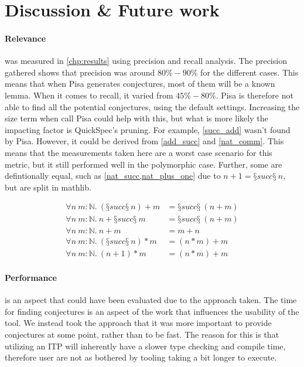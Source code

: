 \section{Discussion \& Future work}\label{sec:discussion}

\paragraph*{Relevance} was measured in \cref{chp:results} using precision and recall analysis.
The precision gathered shows that precision was around $80\%-90\%$ for the different cases.
This means that when Pisa generates conjectures, most of them will be a known lemma.
When it comes to recall, it varied from $45\%-80\%$.
Pisa is therefore not able to find all the potential conjectures, using the default settings.
Increasing the size term when call Pisa could help with this, but what is more likely the impacting factor is QuickSpec's pruning.
For example, \cref{succ_add} wasn't found by Pisa.
However, it could be derived from \cref{add_succ} and \cref{nat_comm}.
This means that the measurements taken here are a worst case scenario for this metric, but it still performed well in the polymorphic case.
Further, some are defintionally equal, such as \cref{nat_succ,nat_plus_one} due to $n+1 = §succ§\ n$, but are split in mathlib.

\vspace{-0.7cm}
\begin{align}
\forall n\ m : \mathbb{N}.\ (§succ§\ n) + m &= §succ§\ (n + m) \label{succ_add} \\
\forall n\ m : \mathbb{N}.\ n + §succ§\ m &= §succ§\ (n + m) \label{add_succ} \\
\forall n\ m : \mathbb{N}.\ n + m &= m + n \label{nat_comm} \\
\forall n\ m : \mathbb{N}.\ (§succ§\ n) * m &= (n * m) + m \label{nat_succ} \\
\forall n\ m : \mathbb{N}.\ (n + 1) * m &= (n * m) + m \label{nat_plus_one}
\end{align}

\paragraph*{Performance} is an aspect that could have been evaluated due to the approach taken.
The time for finding conjectures is an aspect of the work that influences the usability of the tool.
We instead took the approach that it was more important to provide conjectures at some point, rather than to be fast.
The reason for this is that utilizing an ITP will inherently have a slower type checking and compile time, therefore user are not as bothered by tooling taking a bit longer to execute.

